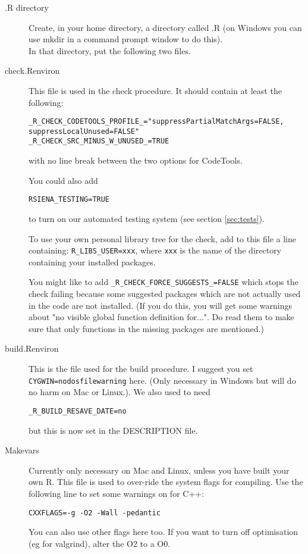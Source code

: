 \documentclass[12pt, a4paper]{article}
\renewcommand{\=}{\,=\,}
\newcommand{\+}{\,+\,}
\begin{document}
\begin{description}
\item[.R directory] Create, in your home directory, a directory called .R (on
  Windows you can use mkdir in a command prompt window to do this).\\
  In that directory, put the following two files.
\item[check.Renviron] This file is used in the check procedure. It should
 contain at least the following:
{\small
\begin{verbatim}
_R_CHECK_CODETOOLS_PROFILE_="suppressPartialMatchArgs=FALSE,
suppressLocalUnused=FALSE"
_R_CHECK_SRC_MINUS_W_UNUSED_=TRUE
\end{verbatim}
}
with no line break between the two options for CodeTools.

You could also add
\begin{verbatim}
RSIENA_TESTING=TRUE
\end{verbatim}
to turn on our automated testing system (see section \ref{sec:tests}).

To use your own personal library tree for the check, add to this file a line
containing: \verb|R_LIBS_USER=xxx|, where \verb|xxx| is the name of the directory
containing your installed packages.

You might like to add \verb|_R_CHECK_FORCE_SUGGESTS_=FALSE| which stops the
check failing because some suggested packages which are not actually used in the
code are not installed. (If you do this, you will get some warnings about "no
visible global function definition for...". Do read them to make sure that only
functions in the missing packages are mentioned.)

\item[build.Renviron] This is the file used for the build procedure.  I suggest
  you set \verb|CYGWIN=nodosfilewarning| here. (Only necessary in Windows but
  will do no harm on Mac or Linux.). We also used to need
\begin{verbatim}
_R_BUILD_RESAVE_DATE=no
\end{verbatim}
but this is now set in the DESCRIPTION file.
\item[Makevars] Currently only necessary on Mac and Linux, unless you have built
  your own R. This file is used to over-ride the system flags for compiling. Use
  the following line to set some warnings on for C++:
 \begin{verbatim}
CXXFLAGS=-g -O2 -Wall -pedantic
\end{verbatim}
You can also use other flags here too.
If you want to turn off optimisation (eg for valgrind), alter the O2 to a O0.
\end{description}
\end{document}
